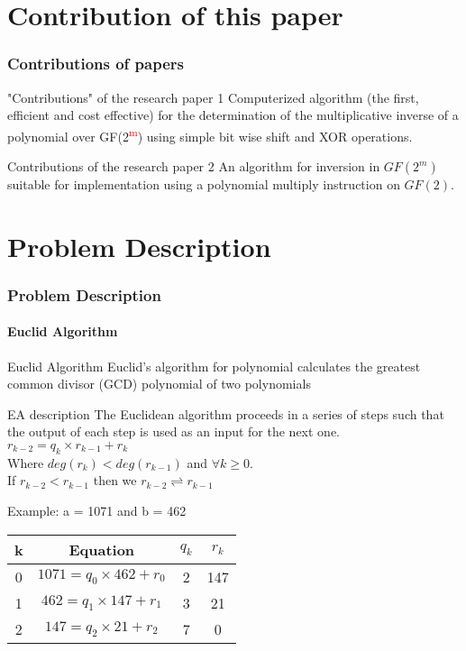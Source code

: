 \documentclass[12pt]{beamer}
\def\SP#1{\textsuperscript{\textcolor{red}{#1}}}
\begin{document}
\section{Contribution of this paper}
\begin{frame}
\frametitle{Contributions of papers}
	\begin{block}{"Contributions" of the research paper 1}
	\justifying
		Computerized algorithm (the first, efficient and cost effective) for the determination of the multiplicative inverse of a polynomial over GF(2\SP{m}) using simple bit wise shift and XOR operations.
	\end{block}
	\begin{block}{Contributions of the research paper 2}
		\justifying
		An algorithm for inversion in $GF(2^{m})$ suitable for implementation using a polynomial multiply instruction on $GF(2)$.
	\end{block}
\end{frame}

\section{Problem Description}
\begin{frame}
\frametitle{Problem Description}
\framesubtitle {Euclid Algorithm}
	\begin{block}{Euclid Algorithm}
		\scriptsize
		Euclid’s algorithm for polynomial calculates the greatest common divisor (GCD) polynomial of two polynomials
	\end{block}
	
	\begin{block}{EA description}
		\tiny
		The Euclidean algorithm proceeds in a series of steps such that the output of each step is used as an input for the next one.\\
		$r_{k-2} = q_{k} \times r_{k-1} + r_{k}$\\
		Where  $deg(r_{k}) < deg (r_{k-1})$ and $\forall k \geq 0$. \\
		If $r_{k-2} < r_{k-1}$ then we $r_{k-2} \rightleftharpoons r_{k-1}$
	\end{block}
	
	\begin{block}{Example: a = 1071 and b = 462}
		\begin{center}
		\tiny
			\begin{tabular}{| c | c | c | c |}
				\hline
				k & Equation & $q_{k}$  & $r_{k}$ \\ \hline
				0 & $1071  = q_{0}\times462 + r_{0}$ & 2 & 147 \\ \hline
				1 & $462  = q_{1}\times147 + r_{1}$ & 3 & 21 \\ \hline
				2 & $147  = q_{2}\times21 + r_{2}$ & 7 & 0  \\ \hline
			\end{tabular}
		\end{center}
	\end{block}
\end{frame}
\end{document}

